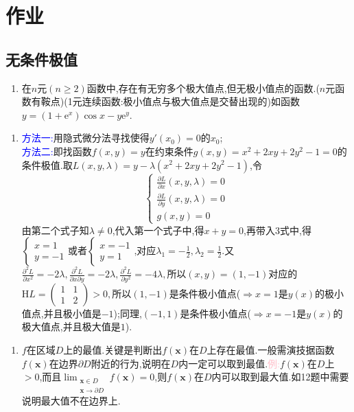 \documentclass[UTF8]{ctexart}
\newcommand{\e}{\mathrm{e}}
\newcommand{\p}[2]{\frac{\partial #1}{\partial #2}}
\newcommand{\x}{\boldsymbol{x}}
\begin{document}
    \appendix
    \section{作业}
    \subsection{无条件极值}
    \begin{enumerate}[3.]
        \item 在$n$元$(n\ge 2)$函数中,存在有无穷多个极大值点,但无极小值点的函数.($n$元函数有鞍点)(1元连续函数:极小值点与极大值点是交替出现的)如函数$y=(1+\e^x)\cos x-y\e^y$.
    \end{enumerate}
    \begin{enumerate}[8.]
        \item \textcolor{blue}{方法一:}用隐式微分法寻找使得$y'(x_0)=0$的$x_0$;\\
        \textcolor{blue}{方法二:}即找函数$f(x,y)=y$在约束条件$g(x,y)=x^2+2xy+2y^2-1=0$的条件极值.取$L(x,y,\lambda)=y-\lambda(x^2+2xy+2y^2-1)$,令$$\begin{cases}
            \p{L}{x}(x,y,\lambda)=0\\
            \p{L}{y}(x,y,\lambda)=0\\
            g(x,y)=0
        \end{cases}$$
        由第二个式子知$\lambda\not=0$,代入第一个式子中,得$x+y=0$,再带入3式中,得$\begin{cases}
            x=1\\
            y=-1
        \end{cases}$或者$\begin{cases}
            x=-1\\
            y=1
        \end{cases}$,对应$\lambda_1=-\frac{1}{2},\lambda_2=\frac{1}{2}$.又$\frac{\partial^2L}{\partial x^2}=-2\lambda,\frac{\partial^2L}{\partial x\partial y}=-2\lambda,\frac{\partial^2L}{\partial y^2}=-4\lambda,$所以$(x,y)=(1,-1)$对应的$\mathrm{H}L=\begin{pmatrix}
            1&1\\
            1&2
        \end{pmatrix}>0,$所以$(1,-1)$是条件极小值点($\Rightarrow x=1$是$y(x)$的极小值点,并且极小值是$-1$);同理,$(-1,1)$是条件极小值点($\Rightarrow x=-1$是$y(x)$的极大值点,并且极大值是$1$).
    \end{enumerate}

    \begin{enumerate}[11.12.]
        \item $f$在区域$D$上的最值.关键是判断出$f(\x)$在$D$上存在最值.一般需演技据函数$f(\x)$在边界$\partial D$附近的行为,说明在$D$内一定可以取到最值.\textcolor{pink}{例:}$f(\x)$在$D$上$>0$,而且$\lim_{\substack{\x\in D \\ \x\to\partial D}}f(\x)=0$,则$f(\x)$在$D$内可以取到最大值.如12题中需要说明最大值不在边界上.
    \end{enumerate}
\end{document}

